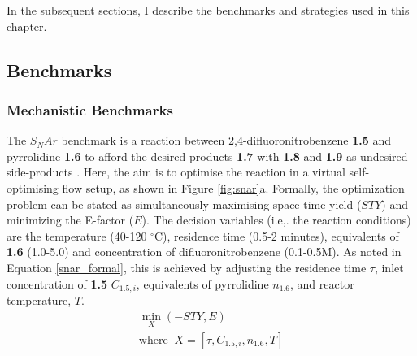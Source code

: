 In the subsequent sections, I describe the benchmarks and strategies used in this chapter.

\subsection{Benchmarks}

\subsubsection{Mechanistic Benchmarks}

The $S_NAr$ benchmark is a reaction between 2,4-difluoronitrobenzene \textbf{1.5} and pyrrolidine \textbf{1.6} to afford the desired products \textbf{1.7} with \textbf{1.8} and \textbf{1.9} as undesired side-products \cite{Hone2017}. Here, the aim is to optimise the reaction in a virtual self-optimising flow setup, as shown in Figure \ref{fig:snar}a. Formally, the optimization problem can be stated as simultaneously maximising space time yield ($STY$) and minimizing the E-factor ($E$). The decision variables (i.e,. the reaction conditions) are the temperature (40-120 $^{\circ}$C), residence time (0.5-2 minutes), equivalents of \textbf{1.6} (1.0-5.0) and concentration of difluoronitrobenzene (0.1-0.5M). As noted in Equation \ref{snar_formal}, this is achieved by adjusting the residence time $\tau$, inlet concentration of \textbf{1.5} $C_{1.5,i}$, equivalents of pyrrolidine $n_{1.6}$, and reactor temperature, $T$.
\begin{equation}
	\label{snar_formal}
	\begin{gathered}
		\min_{X}{(-STY, E)} \\
		\text{where}\;\; X = [\tau,C_{1.5,i},n_{1.6}, T]
	\end{gathered}
\end{equation}


